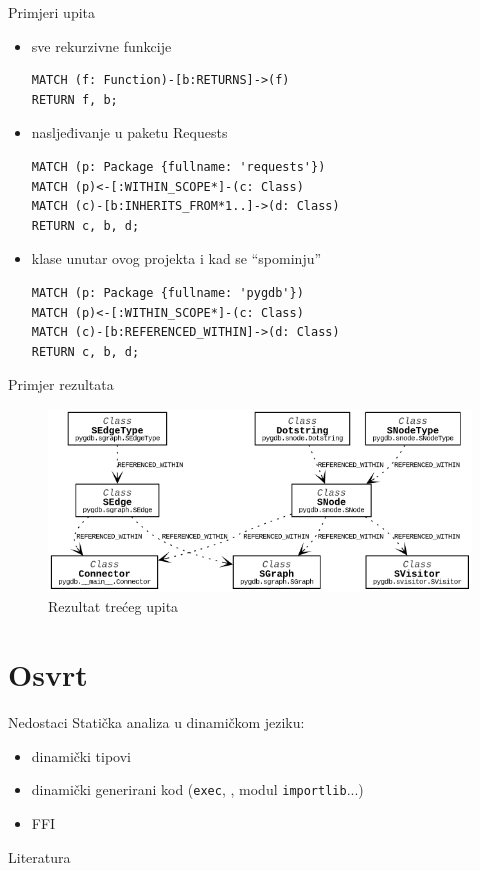 \documentclass{beamer}
\begin{document}
\begin{frame}[fragile]{Primjeri upita}

\begin{itemize}
\item sve rekurzivne funkcije
\begin{lstlisting}
MATCH (f: Function)-[b:RETURNS]->(f)
RETURN f, b;
\end{lstlisting}

\item nasljeđivanje u paketu Requests
\begin{lstlisting}
MATCH (p: Package {fullname: 'requests'})
MATCH (p)<-[:WITHIN_SCOPE*]-(c: Class)
MATCH (c)-[b:INHERITS_FROM*1..]->(d: Class)
RETURN c, b, d;
\end{lstlisting}

\item klase unutar ovog projekta i kad se \enquote{spominju}
\begin{lstlisting}
MATCH (p: Package {fullname: 'pygdb'})
MATCH (p)<-[:WITHIN_SCOPE*]-(c: Class)
MATCH (c)-[b:REFERENCED_WITHIN]->(d: Class)
RETURN c, b, d;
\end{lstlisting}

\end{itemize}
\end{frame}

\begin{frame}{Primjer rezultata}
\begin{figure}
\includegraphics[scale=0.5]{assets/klref.png}
\centering
\caption{Rezultat trećeg upita}
\label{fig:2}
\end{figure}
\end{frame}

\section{Osvrt}
\begin{frame}[fragile]{Nedostaci}
Statička analiza u dinamičkom jeziku:
\begin{itemize}

\item dinamički tipovi
\item dinamički generirani kod (\texttt{exec}, , modul \texttt{importlib}...)
\item FFI
\end{itemize}

\end{frame}

\begin{frame}[t]{Literatura}
\printbibliography
\end{frame}
\end{document}
